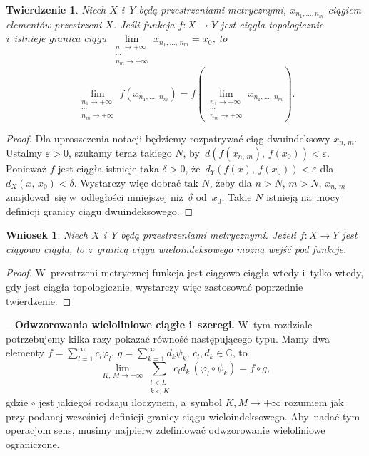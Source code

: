 \documentclass[a4paper,11pt]{article}
\newtheorem{twr}{Twierdzenie}
\newtheorem{wni}{Wniosek}
\newcommand{\spaceFour}{0.5em}
\newcommand{\ld}{\ldots}
\newcommand{\mb}{\mathbb}
\newcommand{\ra}{\rightarrow}
\newcommand{\wtw}{wtedy i~tylko wtedy}
\newcommand{\del}{\delta}
\newcommand{\veps}{\varepsilon}
\newcommand{\vp}{\varphi}
\newcommand{\C}{\mb{C}}
\newcommand{\Lim}{\lim\limits}
\newcommand{\Sum}{\sum\limits}
\newcommand{\tb}{\textbf}
\newcommand{\noi}{\noindent}
\newcommand{\start}{\noi \tb{--} {}}
\newcommand{\ci}{\circ}
\begin{document}
\begin{twr}
  Niech $X$ i~$Y$ będą przestrzeniami metrycznymi,
  $x_{ n_{ 1 }, \ld, n_{ m } }$ ciągiem elementów przestrzeni $X$.
  Jeśli funkcja $f: X \ra Y$ jest ciągła topologicznie i~istnieje
  granica ciągu
  $\Lim_{ \substack{ n_{ 1 } \ra +\infty \\ \cdots \\ n_{ m } \ra
      +\infty } } x_{ n_{ 1 }, \ld, \, n_{ m } } = x_{ 0 }$, to
  \begin{equation}
    \Lim_{ \substack{ n_{ 1 } \ra +\infty \\ \cdots \\  n_{ m } \ra +\infty } }
    f( x_{ n_{ 1 }, \ld, \, n_{ m } } )
    = f( \Lim_{ \substack{ n_{ 1 } \ra +\infty \\ \cdots \\ n_{ m } \ra
        +\infty } } x_{ n_{ 1 }, \ld, \, n_{ m } } ).
  \end{equation}
\end{twr}

\begin{proof}
  Dla uproszczenia notacji będziemy rozpatrywać ciąg dwuindeksowy
  $x_{ n, \, m }$. Ustalmy $\veps > 0$, szukamy teraz takiego $N$,
  by~$d( f( x_{ n, \, m } ),\, f( x_{ 0 } ) ) < \veps$. Ponieważ $f$
  jest ciągła istnieje taka $\del > 0$, \linebreak
  że~$d_{ Y }( f( x ),\, f( x_{ 0 } ) ) < \veps$
  dla~$d_{ X }( x,\, x_{ 0 } ) < \del$. Wystarczy więc dobrać tak $N$,
  żeby dla $n > N$, $m > N$, $x_{ n, \, m }$ znajdował~się
  w~odległości mniejszej niż~$\del$ od~$x_{ 0 }$. Takie $N$ istnieją
  na~mocy definicji granicy ciągu dwuindeksowego.
\end{proof}

\begin{wni}
  Niech $X$ i~$Y$ będą przestrzeniami metrycznymi. Jeżeli $f: X \ra Y$
  jest ciągowo ciągła, to z~granicą ciągu wieloindeksowego można wejść
  pod funkcje.
\end{wni}

\begin{proof}
  W~przestrzeni metrycznej funkcja jest ciągowo ciągła \wtw, gdy jest
  ciągła topologicznie, wystarczy więc zastosować poprzednie
  twierdzenie.
\end{proof}

\vspace{\spaceFour}


\start \tb{Odwzorowania wieloliniowe ciągłe i~szeregi.} W~tym
rozdziale potrzebujemy kilka razy pokazać równość następującego typu.
Mamy dwa elementy $f = \sum_{ l = 1 }^{ \infty } c_{ l } \vp_{ l }$,
$g = \sum_{ k = 1 }^{ \infty } d_{ k } \psi_{ k }$,
$c_{ l }, d_{ k } \in \C$, to
\begin{equation*}
  \Lim_{ K,\, M \ra +\infty } \Sum_{ \substack{ l < L \\ k < K } }
  c_{ l } d_{ k } \, (\vp_{ l } \ci \psi_{ k } ) = f \ci g,
\end{equation*}
gdzie $\ci$ jest jakiegoś rodzaju iloczynem, a~symbol
$K, M \ra +\infty$ rozumiem jak przy podanej wcześniej definicji
granicy ciągu wieloindeksowego. Aby~nadać tym operacjom sens, musimy
najpierw zdefiniować odwzorowanie wieloliniowe ograniczone.
\end{document}

